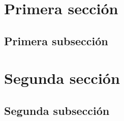 \documentclass{clase}
\begin{document}
\section{Primera sección}
\subsection{Primera subsección}

\section{Segunda sección}
\subsection{Segunda subsección}
\end{document}
